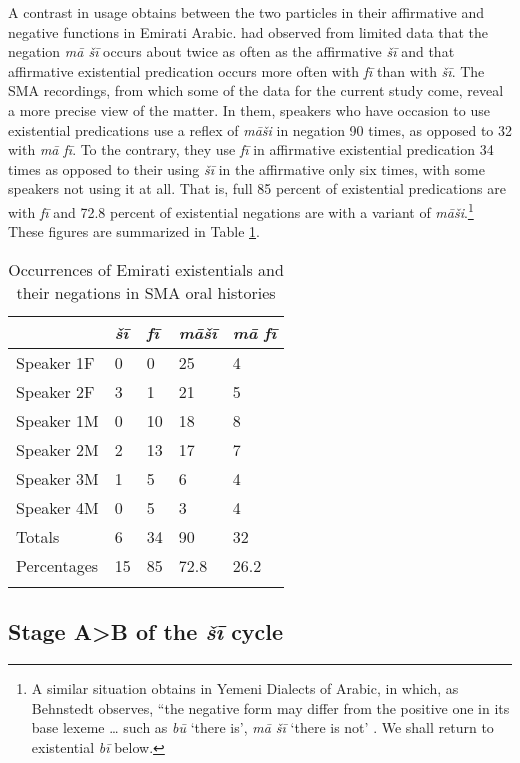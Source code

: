 \documentclass[output=paper]{langsci/langscibook}
\begin{document}
A contrast in usage obtains between the two particles in their affirmative and negative functions in Emirati Arabic. \citet[528]{wilmsen2020a} had observed from limited data that the negation \textit{mā šī} occurs about twice as often as the affirmative \textit{šī} and that affirmative existential predication occurs more often with \textit{fī} than with \textit{šī}. The SMA recordings, from which some of the data for the current study come, reveal a more precise view of the matter. In them, speakers who have occasion to use existential predications use a reflex of \textit{māši} in negation 90 times, as opposed to 32 with \textit{mā fī}. To the contrary, they use \textit{fī} in affirmative existential predication 34 times as opposed to their using \textit{šī} in the affirmative only six times, with some speakers not using it at all. That is, full 85 percent of existential predications are with \textit{fī} and 72.8 percent of existential negations are with a variant of \textit{māši}.\footnote{A similar situation obtains in Yemeni Dialects of Arabic, in which, as Behnstedt observes, “the negative form may differ from the positive one in its base lexeme … such as \textit{bū} ‘there is’, \textit{mā šī} ‘there is not’ \citeyearpar[345]{behnstedt2016a}. We shall return to existential \textit{bī} below.} These figures are summarized in Table \ref{tab:WiAR-2}.

\begin{table}[!h]
	\centering
	\caption{Occurrences of Emirati existentials and their negations in SMA oral histories}
	\label{tab:WiAR-2}
\begin{tabular}{@{}lllll@{}}
\lsptoprule
\textit{} & \textit{šī} & \textit{fī} & \textit{māšī} & \textit{mā fī} \\ \midrule
Speaker 1F & 0 & 0 & 25 & 4 \\
Speaker 2F & 3 & 1 & 21 & 5 \\
Speaker 1M & 0 & 10 & 18 & 8 \\
Speaker 2M & 2 & 13 & 17 & 7 \\
Speaker 3M & 1 & 5 & 6 & 4 \\
Speaker 4M & 0 & 5 & 3 & 4 \\ \midrule
Totals & 6 & 34 & 90 & 32 \\ \midrule
Percentages & 15 & 85 & 72.8 & 26.2 \\ \lspbottomrule   
\end{tabular}
\end{table}

\subsection{Stage A>B of the \textit{šī} cycle} \label{s:WiAR-3.1}
\end{document}
